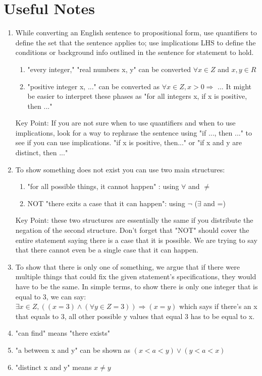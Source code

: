 \documentclass[11pt]{article}
\begin{document}
\section*{Useful Notes}
\begin{enumerate}
\item 
While converting an English sentence to propositional form, use quantifiers to define the set that the sentence applies to; use implications LHS to define the conditions or background info outlined in the sentence for statement to hold.
\begin{enumerate}
\item "every integer," "real numbers x, y" can be converted $\forall x \in Z$ and 
${x,y}\in R$
\item "positive integer x, ..." can be converted as $\forall x \in Z, x>0 \Rightarrow$ ... It might be easier to interpret these phases as "for all integers x, if x is positive, then ..."
\end{enumerate}
Key Point: If you are not sure when to use quantifiers and when to use implications, look for a way to rephrase the sentence using "if ..., then ..." to see if you can use implications. "if x is positive, then..." or "if x and y are distinct, then ..."
\newpage
\item To show something does not exist you can use two main structures:
\begin{enumerate}
\item "for all possible things, it cannot happen" : using $\forall$ and $\neq$
\item NOT "there exits a case that it can happen": using $\neg $ ($\exists$ and =)
\end{enumerate}
Key Point: these two structures are essentially the same if you distribute the negation of the second structure. Don't forget that "NOT" should cover the entire statement saying there is a case that it is possible. We are trying to say that there cannot even be a single case that it can happen.

\item To show that there is only one of something, we argue that if there were multiple things that could fix the given statement's specifications, they would have to be the same. In simple terms, to show there is only one integer that is equal to 3, we can say: \\ $\exists x \in Z, ((x = 3) \wedge (\forall y \in Z = 3)) \Rightarrow (x = y) $ which says if there's an x that equals to 3, all other possible y values that equal 3 has to be equal to x.

\item  "can find" means "there exists"
\item  "a between x and y" can be shown as $ (x < a <y) \vee (y<  a <x)$
\item "distinct x and y" means $x \neq y$

\end{enumerate}
\end{document}
